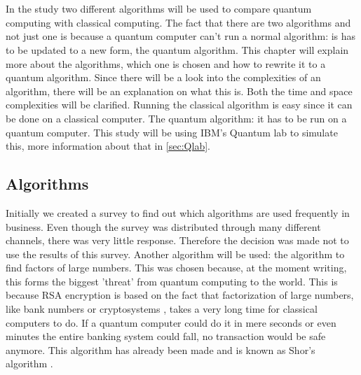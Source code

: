 
\chapter{}
\label{ch:methodologie}


In the study two different algorithms will be used to compare quantum computing with classical computing. 
The fact that there are two algorithms and not just one is because a quantum computer can't run a normal algorithm: is has to be updated to a new form, the quantum algorithm.
This chapter will explain more about the algorithms, which one is chosen and how to rewrite it to a quantum algorithm. Since there will be a look into the complexities of an algorithm, there will be an explanation on what this is.
Both the time and space complexities will be clarified. Running the classical algorithm is easy since it can be done on a classical computer. The quantum algorithm: it has to be run on a quantum computer.
This study will be using IBM's Quantum lab to simulate this, more information about that in \ref{sec:Qlab}.
\section{Algorithms}
Initially we created a survey to find out which algorithms are used frequently in business. Even though the survey was distributed through many different channels, there was very little response. Therefore the decision was made not to use the results of this survey.
Another algorithm will be used: the algorithm to find factors of large numbers. This was chosen because, at the moment writing, this forms the biggest 'threat' from quantum computing to the world.
This is because RSA encryption is based on the fact that factorization of large numbers, like bank numbers or cryptosystems \autocite{Shor}, takes a very long time  for classical computers to do. If a quantum computer could do it in mere seconds or even minutes the entire banking system could fall, no transaction would be safe anymore.
This algorithm has already been made and is known as Shor's algorithm \autocite{Shor}.
